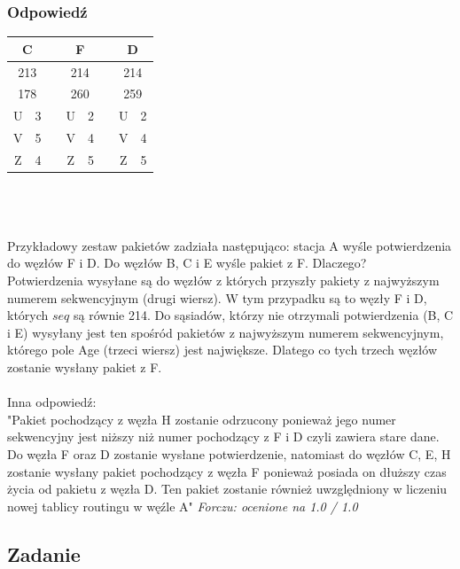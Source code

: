 		\subsubsection{Odpowiedź}
				\begin{tabular}{|c|c|c|c|c|c|c|c|}
					\hline \multicolumn{2}{|c|}{\textbf{C}}  & & \multicolumn{2}{|c|}{\textbf{F}} & & \multicolumn{2}{|c|}{\textbf{D}}\\ 
					\hline \multicolumn{2}{|c|}{213} & &\multicolumn{2}{|c|}{214} & &\multicolumn{2}{|c|}{214} \\ 
					\hline \multicolumn{2}{|c|}{178} & &\multicolumn{2}{|c|}{260} & &\multicolumn{2}{|c|}{259}   \\ 
					\hline U & 3 & & U & 2 & & U & 2\\ 
					\hline V & 5 & & V & 4 & & V & 4\\
					\hline Z & 4 & & Z & 5 & & Z & 5\\
					\hline 
				\end{tabular}\\\\\\
			Przykładowy zestaw pakietów zadziała następująco: stacja A wyśle potwierdzenia do węzłów F i D. Do węzłów B, C i E wyśle pakiet z F. Dlaczego?\\
			Potwierdzenia wysyłane są do węzłów z których przyszły pakiety z najwyższym numerem sekwencyjnym (drugi wiersz). W tym przypadku są to węzły F i D, których $ seq $ są równie 214. Do sąsiadów, którzy nie otrzymali potwierdzenia (B, C i E) wysyłany jest ten spośród pakietów z najwyższym numerem sekwencyjnym, którego pole Age (trzeci wiersz) jest największe. Dlatego co tych trzech węzłów zostanie wysłany pakiet z F.\\\\
			Inna odpowiedź:\\
			"Pakiet pochodzący z węzła H zostanie odrzucony ponieważ jego numer sekwencyjny jest niższy niż numer pochodzący z F i D czyli zawiera stare dane. Do węzła F oraz D zostanie wysłane potwierdzenie, natomiast do węzłów C, E, H zostanie wysłany pakiet pochodzący z węzła F ponieważ posiada on dłuższy czas życia od pakietu z węzła D. Ten pakiet zostanie również uwzględniony w liczeniu nowej tablicy routingu w węźle A"
			{\small \emph{Forczu: ocenione na 1.0 / 1.0}}
\newpage
	\subsection{Zadanie}
